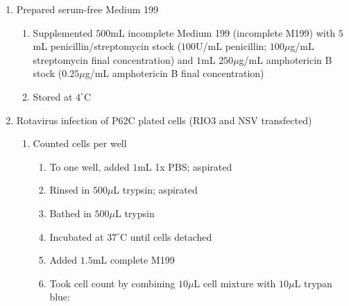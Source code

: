 \begin{enumerate}
	\item Prepared serum-free Medium 199
		\begin{enumerate}
			\item Supplemented $500$mL incomplete Medium 199 (incomplete M199) with $5$mL penicillin/streptomycin stock ($100$U/mL penicillin; $100\mu$g/mL streptomycin final concentration) and $1$mL $250\mu$g/mL amphotericin B stock ($0.25\mu$g/mL amphotericin B final concentration)
			\item Stored at $4^{\circ}$C
		\end{enumerate}
	\item Rotavirus infection of P62C plated cells (RIO3 and NSV transfected)
		\begin{enumerate}
			\item Counted cells per well
				\begin{enumerate}
					\item To one well, added $1$mL 1x PBS; aspirated
					\item Rinsed in $500\mu$L trypsin; aspirated
					\item Bathed in $500\mu$L trypsin
					\item Incubated at $37^{\circ}$C until cells detached
					\item Added $1.5$mL complete M199
					\item Took cell count by combining $10\mu$L cell mixture with $10\mu$L trypan blue:
			

\end{enumerate}
\end{enumerate}
\end{enumerate}
